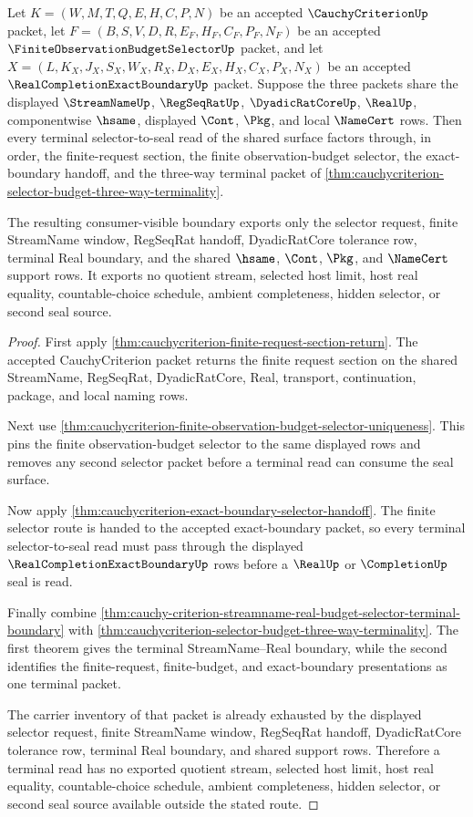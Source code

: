\begin{theorem}
\label{thm:cauchycriterion-terminal-selector-seal-nochoice-exhaustion}
Let $K=(W,M,T,Q,E,H,C,P,N)$ be an accepted $\CauchyCriterionUp$ packet, let
$F=(B,S,V,D,R,E_F,H_F,C_F,P_F,N_F)$ be an accepted
$\FiniteObservationBudgetSelectorUp$ packet, and let
$X=(L,K_X,J_X,S_X,W_X,R_X,D_X,E_X,H_X,C_X,P_X,N_X)$ be an accepted
$\RealCompletionExactBoundaryUp$ packet. Suppose the three packets share the
displayed $\StreamNameUp$, $\RegSeqRatUp$, $\DyadicRatCoreUp$, $\RealUp$,
componentwise $\hsame$, displayed $\Cont$, $\Pkg$, and local $\NameCert$ rows.
Then every terminal selector-to-seal read of the shared surface factors through,
in order, the finite-request section, the finite observation-budget selector,
the exact-boundary handoff, and the three-way terminal packet of
\autoref{thm:cauchycriterion-selector-budget-three-way-terminality}.

The resulting consumer-visible boundary exports only the selector request,
finite StreamName window, RegSeqRat handoff, DyadicRatCore tolerance row,
terminal Real boundary, and the shared $\hsame$, $\Cont$, $\Pkg$, and
$\NameCert$ support rows. It exports no quotient stream, selected host limit,
host real equality, countable-choice schedule, ambient completeness, hidden
selector, or second seal source.
\end{theorem}
\begin{proof}
First apply \autoref{thm:cauchycriterion-finite-request-section-return}. The
accepted CauchyCriterion packet returns the finite request section on the shared
StreamName, RegSeqRat, DyadicRatCore, Real, transport, continuation, package,
and local naming rows.

Next use
\autoref{thm:cauchycriterion-finite-observation-budget-selector-uniqueness}.
This pins the finite observation-budget selector to the same displayed rows and
removes any second selector packet before a terminal read can consume the seal
surface.

Now apply \autoref{thm:cauchycriterion-exact-boundary-selector-handoff}. The
finite selector route is handed to the accepted exact-boundary packet, so every
terminal selector-to-seal read must pass through the displayed
$\RealCompletionExactBoundaryUp$ rows before a $\RealUp$ or $\CompletionUp$ seal
is read.

Finally combine
\autoref{thm:cauchy-criterion-streamname-real-budget-selector-terminal-boundary}
with \autoref{thm:cauchycriterion-selector-budget-three-way-terminality}. The
first theorem gives the terminal StreamName--Real boundary, while the second
identifies the finite-request, finite-budget, and exact-boundary presentations
as one terminal packet.

The carrier inventory of that packet is already exhausted by the displayed
selector request, finite StreamName window, RegSeqRat handoff, DyadicRatCore
tolerance row, terminal Real boundary, and shared support rows. Therefore a
terminal read has no exported quotient stream, selected host limit, host real
equality, countable-choice schedule, ambient completeness, hidden selector, or
second seal source available outside the stated route.
\end{proof}
